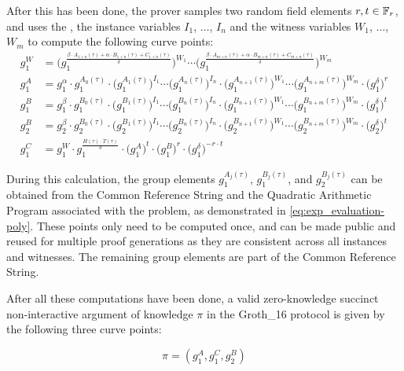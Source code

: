 After this has been done, the prover samples two random field elements $r,t\in \mathbb{F}_r$, and uses the , the instance variables $I_1$, $\ldots$, $I_n$ and the witness variables $W_1$, $\ldots$, $W_m$ to compute the following curve points:
\begin{align*}
g_1^W & = \Big( g_1^{\frac{\beta\cdot A_{1+n}(\tau)+\alpha\cdot B_{1+n}(\tau)+C_{1+n}(\tau)}{\delta}}\Big)^{W_1}\cdots \Big(g_1^{\frac{\beta\cdot A_{m+n}(\tau)+\alpha\cdot B_{m+n}(\tau)+C_{m+n}(\tau)}{\delta}}\Big)^{W_m}\\
g_1^A & = g_1^\alpha \cdot g_1^{A_0(\tau)} \cdot \Big(g_1^{A_1(\tau)}\Big)^{I_1}\cdots \Big(g_1^{A_n(\tau)}\Big)^{I_n} \cdot \Big(g_1^{A_{n+1}(\tau)}\Big)^{W_1}\cdots \Big(g_1^{A_{n+m}(\tau)}\Big)^{W_m} \cdot \Big(g_1^\delta\Big)^r \\
g_1^B & = g_1^\beta \cdot g_1^{B_0(\tau)} \cdot \Big(g_1^{B_1(\tau)}\Big)^{I_1}\cdots \Big(g_1^{B_n(\tau)}\Big)^{I_n} \cdot \Big(g_1^{B_{n+1}(\tau)}\Big)^{W_1}\cdots \Big(g_1^{B_{n+m}(\tau)}\Big)^{W_m} \cdot \Big(g_1^\delta\Big)^t\\
g_2^B & = g_2^\beta \cdot g_2^{B_0(\tau)} \cdot \Big(g_2^{B_1(\tau)}\Big)^{I_1}\cdots \Big(g_2^{B_n(\tau)}\Big)^{I_n} \cdot \Big(g_2^{B_{n+1}(\tau)}\Big)^{W_1}\cdots \Big(g_2^{B_{n+m}(\tau)}\Big)^{W_m} \cdot \Big(g_2^\delta\Big)^t \\
g_1^C & = g_1^W\cdot g_1^{\frac{H(\tau)\cdot T(\tau)}{\delta}} \cdot \Big(g_1^A\Big)^t \cdot \Big(g_1^B\Big)^r \cdot \Big(g_1^\delta\Big)^{-r\cdot t}
\end{align*}

During this calculation, the group elements $g_1^{A_j(\tau)}$, $g_1^{B_j(\tau)}$, and $g_2^{B_j(\tau)}$ can be obtained from the Common Reference String and the Quadratic Arithmetic Program associated with the problem, as demonstrated in \ref{eq:exp_evaluation-poly}. These points only need to be computed once, and can be made public and reused for multiple proof generations as they are consistent across all instances and witnesses. The remaining group elements are part of the Common Reference String.

After all these computations have been done, a valid zero-knowledge succinct non-interactive argument of knowledge $\pi$ in the Groth\_16 protocol is given by the following three curve points:

\begin{equation}
\label{def:groth16-snark}
\pi = (g_1^A,g_1^C,g_2^B)
\end{equation}

